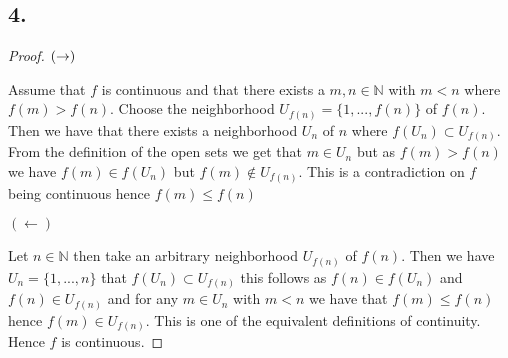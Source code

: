 \documentclass{amsart}
\theoremstyle{plain}
\theoremstyle{definition}
\theoremstyle{remark}
\begin{document}
\subsection*{4.}
\begin{proof}


    $\\ (\rightarrow)$


    Assume that $f$ is continuous and that there exists a $m,n\in \mathbb{N}$ with $m<n$ where $f(m)> f(n)$. Choose the neighborhood $U_{f(n)}=\{1,...,f(n)\}$ of $f(n)$. Then we have that there exists a neighborhood $U_n$ of $n$ where $f(U_n)\subset U_{f(n)}$. From the definition of the open sets we get that $m\in U_n$ but as $f(m)> f(n)$ we have $f(m)\in f(U_n)$ but $f(m)\not \in U_{f(n)}$. This is a contradiction on $f$ being continuous hence $f(m)\leq f(n)$

    $(\leftarrow)$


    Let $n\in \mathbb{N}$ then take an arbitrary neighborhood $U_{f(n)}$ of $f(n)$. Then we have $U_{n}=\{1,...,n\}$ that $f(U_n)\subset U_{f(n)}$ this follows as $f(n)\in f(U_n)$ and $f(n)\in U_{f(n)}$ and for any $m\in U_n$ with $m<n$ we have that $f(m)\leq f(n)$ hence $f(m)\in U_{f(n)}$. This is one of the equivalent definitions of continuity. Hence $f$ is continuous.

\end{proof}
\end{document}
